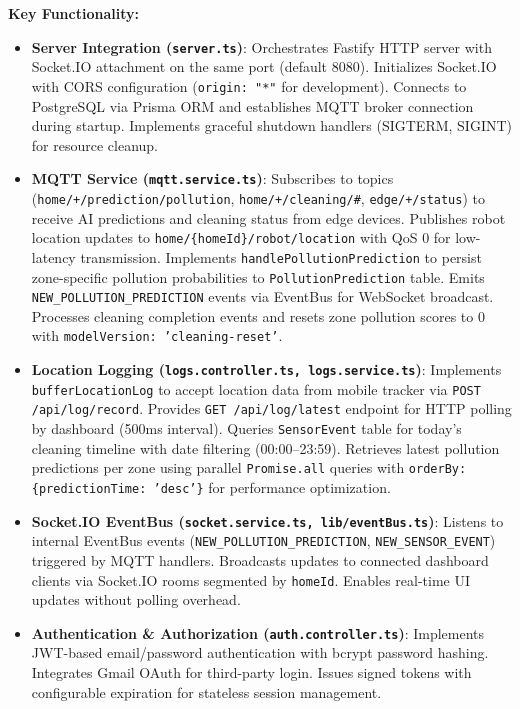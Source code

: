 \documentclass[conference]{IEEEtran}
\begin{document}
\textbf{Key Functionality:}
\begin{itemize}
    \item \textbf{Server Integration (\texttt{server.ts})}: Orchestrates Fastify HTTP server with Socket.IO attachment on the same port (default 8080). Initializes Socket.IO with CORS configuration (\texttt{origin: "*"} for development). Connects to PostgreSQL via Prisma ORM and establishes MQTT broker connection during startup. Implements graceful shutdown handlers (SIGTERM, SIGINT) for resource cleanup.
    \item \textbf{MQTT Service (\texttt{mqtt.service.ts})}: Subscribes to topics (\texttt{home/+/prediction/pollution}, \texttt{home/+/cleaning/\#}, \texttt{edge/+/status}) to receive AI predictions and cleaning status from edge devices. Publishes robot location updates to \texttt{home/\{homeId\}/robot/location} with QoS 0 for low-latency transmission. Implements \texttt{handlePollutionPrediction} to persist zone-specific pollution probabilities to \texttt{PollutionPrediction} table. Emits \texttt{NEW\_POLLUTION\_PREDICTION} events via EventBus for WebSocket broadcast. Processes cleaning completion events and resets zone pollution scores to 0 with \texttt{modelVersion: 'cleaning-reset'}.
    \item \textbf{Location Logging (\texttt{logs.controller.ts, logs.service.ts})}: Implements \texttt{bufferLocationLog} to accept location data from mobile tracker via \texttt{POST /api/log/record}. Provides \texttt{GET /api/log/latest} endpoint for HTTP polling by dashboard (500ms interval). Queries \texttt{SensorEvent} table for today's cleaning timeline with date filtering (00:00–23:59). Retrieves latest pollution predictions per zone using parallel \texttt{Promise.all} queries with \texttt{orderBy: \{predictionTime: 'desc'\}} for performance optimization.
    \item \textbf{Socket.IO EventBus (\texttt{socket.service.ts, lib/eventBus.ts})}: Listens to internal EventBus events (\texttt{NEW\_POLLUTION\_PREDICTION}, \texttt{NEW\_SENSOR\_EVENT}) triggered by MQTT handlers. Broadcasts updates to connected dashboard clients via Socket.IO rooms segmented by \texttt{homeId}. Enables real-time UI updates without polling overhead.
    \item \textbf{Authentication \& Authorization (\texttt{auth.controller.ts})}: Implements JWT-based email/password authentication with bcrypt password hashing. Integrates Gmail OAuth for third-party login. Issues signed tokens with configurable expiration for stateless session management.
\end{itemize}
\end{document}
